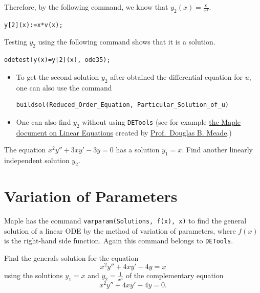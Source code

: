 \documentclass[
  12pt]{elegantbook}
\begin{document}
\begin{solution}
Therefore, by the following command, we know that \(y_2(x)=\frac{c}{x^4}\).

\begin{verbatim}
y[2](x):=x*v(x);
\end{verbatim}

Testing \(y_2\) using the following command shows that it is a solution.

\begin{verbatim}
odetest(y(x)=y[2](x), ode35);
\end{verbatim}

\end{solution}

\begin{itemize}
\item
  To get the second solution \(y_2\) after obtained the differential equation for \(u\), one can also use the command

\begin{verbatim}
buildsol(Reduced_Order_Equation, Particular_Solution_of_u)
\end{verbatim}
\item
  One can also find \(y_2\) without using \texttt{DETools} (see for example \href{https://www.maplesoft.com/applications/view.aspx?SID=4715\&view=html\#mapleautobookmark23}{the Maple document on Linear Equations} created by \href{http://www.math.sc.edu/~meade/}{Prof.~Douglas B. Meade}.)
\end{itemize}

\begin{exercise}
The equation \(x^2y'' + 3xy' - 3y=0\) has a solution \(y_1=x\). Find another linearly independent solution \(y_2\).
\end{exercise}

\hypertarget{variation-of-parameters}{%
\section{Variation of Parameters}\label{variation-of-parameters}}

Maple has the command \texttt{varparam(Solutions,\ f(x),\ x)} to find the general solution of a linear ODE by the method of variation of parameters, where \(f(x)\) is the right-hand side function. Again this command belongs to \texttt{DETools}.

\begin{example}
Find the generals solution for the equation
\[x^2y'' + 4xy' - 4y=x\]
using the solutions \(y_1=x\) and \(y_2=\frac{1}{x^4}\) of the complementary equation
\[x^2y'' + 4xy' - 4y=0.\]
\end{example}
\end{document}
